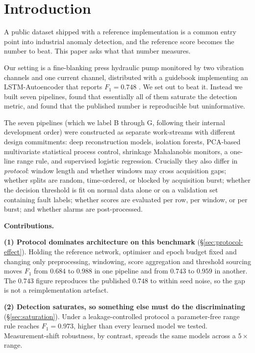 \documentclass{article}
\begin{document}
\section{Introduction}
\label{sec:intro}

A public dataset shipped with a reference implementation is a common entry
point into industrial anomaly detection, and the reference score becomes the
number to beat. This paper asks what that number measures.

Our setting is a fine-blanking press hydraulic pump monitored by two vibration
channels and one current channel, distributed with a guidebook implementing an
LSTM-Autoencoder that reports $F_1 = 0.748$ \citep{kamp2022press}. We set out
to beat it. Instead we built seven pipelines, found that essentially all of
them saturate the detection metric, and found that the published number is
reproducible but uninformative.

The seven pipelines (which we label B through G, following their internal
development order) were constructed as separate work-streams with different
design commitments: deep reconstruction models, isolation forests, PCA-based
multivariate statistical process control, shrinkage Mahalanobis monitors, a
one-line range rule, and supervised logistic regression. Crucially they also
differ in \emph{protocol}: window length and whether windows may cross
acquisition gaps; whether splits are random, time-ordered, or blocked by
acquisition burst; whether the decision threshold is fit on normal data alone
or on a validation set containing fault labels; whether scores are evaluated
per row, per window, or per burst; and whether alarms are post-processed.

\textbf{Contributions.}

\textbf{(1) Protocol dominates architecture on this benchmark}
(\S\ref{sec:protocol-effect}). Holding the reference network, optimiser and
epoch budget fixed and changing only preprocessing, windowing, score
aggregation and threshold sourcing moves $F_1$ from $0.684$ to $0.988$ in one
pipeline and from $0.743$ to $0.959$ in another. The $0.743$ figure reproduces
the published $0.748$ to within seed noise, so the gap is not a
reimplementation artefact.

\textbf{(2) Detection saturates, so something else must do the discriminating}
(\S\ref{sec:saturation}). Under a leakage-controlled protocol a parameter-free
range rule reaches $F_1 = 0.973$, higher than every learned model we tested.
Measurement-shift robustness, by contrast, spreads the same models across a
$5\times$ range.
\end{document}
